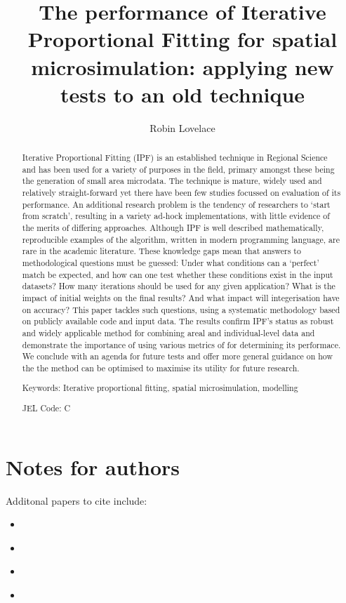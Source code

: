 \documentclass[a4paper,10pt]{article}
\title{The performance of Iterative Proportional Fitting for spatial microsimulation: applying new tests to an old technique}
\author{Robin Lovelace}
\begin{document}
\maketitle

\begin{abstract}
Iterative Proportional Fitting (IPF)
is an established technique in Regional Science and
 has been used for a variety of purposes in the field, primary amongst these being 
the generation of small area microdata.  
The technique is mature, widely used and relatively straight-forward
yet there have been few studies focussed on evaluation of its performance. 
An additional research problem is the tendency of 
researchers to `start from scratch', resulting in a variety ad-hock implementations,
with little evidence of the merits of differing approaches.
Although IPF is well described mathematically, reproducible
examples of the algorithm, written in modern programming language, are rare in the academic literature.
These knowledge gaps mean that answers to methodological questions must be guessed:
Under what conditions can a `perfect' 
match be expected, and how can one test whether these conditions exist in the input datasets?  
How many iterations should be used for any given application? 
What is the impact of initial weights on the final results? 
And what impact will integerisation have on accuracy?  
This paper tackles such questions, using a systematic methodology 
based on publicly available code and input data. 
The results confirm IPF's status as robust and widely applicable 
method for combining areal and individual-level data and demonstrate the importance
of using various metrics of for determining its performace.
We conclude with an agenda for future tests and offer more general guidance on how the 
the method can be optimised to maximise its utility for future research.

Keywords: Iterative proportional fitting, spatial microsimulation, modelling

JEL Code: C
\end{abstract}

\section{Notes for authors}
Additonal papers to cite include:
\begin{itemize}
 \item \citet{harland2012}
\item \citet{Smith2009}
\item \citet{Cullinan2010}
\item 
\end{itemize}
\end{document}
